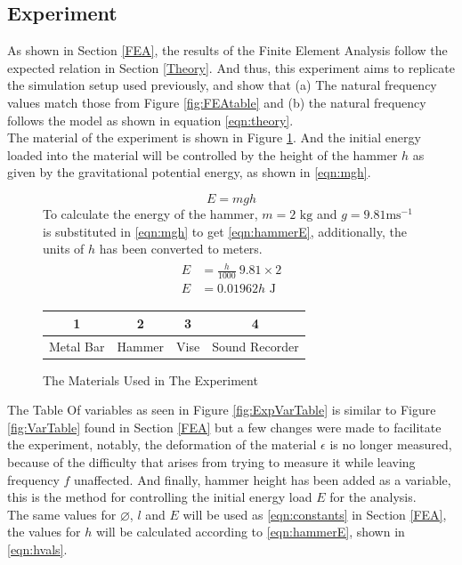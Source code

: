 \documentclass[a4paper,12pt]{article}
\begin{document}
    \subsection{Experiment}\label{Experiment}%
    As shown in Section \ref{FEA}, the results of the Finite Element Analysis follow the expected relation in Section \ref{Theory}. And thus, this experiment aims to replicate the simulation setup used previously, and show that (a) The natural frequency values match those from Figure \ref{fig:FEAtable} and (b) the natural frequency follows the model as shown in equation \eqref{eqn:theory}.\\
    The material of the experiment is shown in Figure \ref{fig:materials}. And the initial energy loaded into the material will be controlled by the height of the hammer $h$ as given by the gravitational potential energy, as shown in \eqref{eqn:mgh}.
    \begin{figure}[H]%
    \begin{equation}\label{eqn:mgh}
     E=mgh
    \end{equation}
    To calculate the energy of the hammer, $m=2\text{ kg}$ and $g=9.81\text{ms}^{-1}$ is substituted in \eqref{eqn:mgh} to get \eqref{eqn:hammerE}, additionally, the units of $h$ has been converted to meters.
    \begin{align}%
    \label{eqn:hammerE}
    \begin{split}
     E&=\frac{h}{1000}~9.81\times2\\
     E&=0.01962h \text{ J}
    \end{split}
    \end{align}

    \begin{center}
    \begin{tabular}[H]{|c|c|c|c|}
    \hline
    1 & 2 & 3 & 4\\
    \hline
    Metal Bar & Hammer & Vise & Sound Recorder\\
    \hline
    \end{tabular}
    \end{center}
    \caption{The Materials Used in The Experiment}\label{fig:materials}
    \end{figure}
    The Table Of variables as seen in  Figure \ref{fig:ExpVarTable} is similar to Figure \ref{fig:VarTable}  found in Section \ref{FEA} but a few changes were made to facilitate the experiment, notably, the deformation of the material $\epsilon$ is no longer measured, because of the difficulty that arises from trying to measure it while leaving frequency $f$ unaffected. And finally, hammer height has been added as a variable, this is the method for controlling the initial energy load $E$ for the analysis.\\
    The same values for $\diameter$, $l$ and $E$ will be used as \eqref{eqn:constants} in Section \ref{FEA}, the values for $h$ will be calculated according to \eqref{eqn:hammerE}, shown in \eqref{eqn:hvals}.
\end{document}

